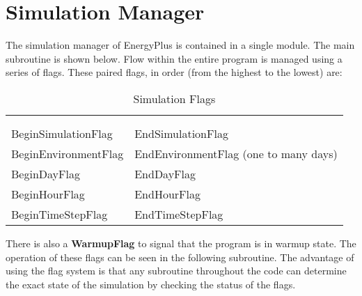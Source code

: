 \section{Simulation Manager}\label{simulation-manager}

The simulation manager of EnergyPlus is contained in a single module. The main subroutine is shown below. Flow within the entire program is managed using a series of flags. These paired flags, in order (from the highest to the lowest) are:

\begin{longtable}[c]{@{}ll@{}}
\caption{Simulation Flags \label{table:simulation-flags}} \tabularnewline
\toprule
\tabularnewline
\endfirsthead

\caption[]{Simulation Flags} \tabularnewline
\toprule
\tabularnewline
\endhead

BeginSimulationFlag & EndSimulationFlag \tabularnewline
BeginEnvironmentFlag & EndEnvironmentFlag (one to many days) \tabularnewline
BeginDayFlag & EndDayFlag \tabularnewline
BeginHourFlag & EndHourFlag \tabularnewline
BeginTimeStepFlag & EndTimeStepFlag \tabularnewline
\bottomrule
\end{longtable}

There is also a \textbf{WarmupFlag} to signal that the program is in warmup state. The operation of these flags can be seen in the following subroutine. The advantage of using the flag system is that any subroutine throughout the code can determine the exact state of the simulation by checking the status of the flags.

